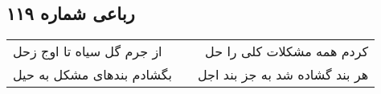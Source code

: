 \begin{center}
\section*{رباعی شماره ۱۱۹}
\label{sec:sh119}
\begin{longtable}{l p{0.5cm} r}
از جرم گل سیاه تا اوج زحل
&&
کردم همه مشکلات کلی را حل
\\
بگشادم بندهای مشکل به حیل
&&
هر بند گشاده شد به جز بند اجل
\\
\end{longtable}
\end{center}
